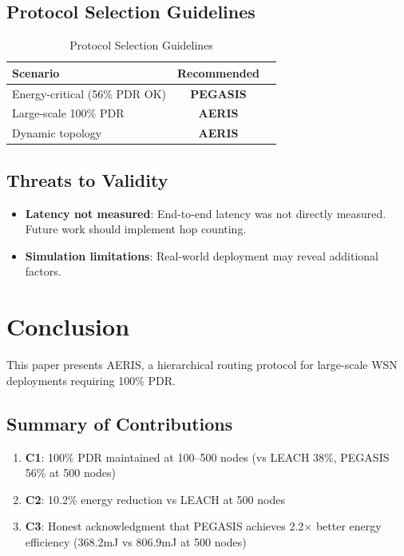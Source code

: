 \documentclass[twocolumn]{article}
\begin{document}
\subsection{Protocol Selection Guidelines}

\begin{table}[htbp]
\centering
\caption{Protocol Selection Guidelines}
\label{tab:guidelines}
\begin{tabular}{@{}lcc@{}}
\toprule
Scenario & Recommended \\
\midrule
Energy-critical (56\% PDR OK) & \textbf{PEGASIS} \\
Large-scale 100\% PDR & \textbf{AERIS} \\
Dynamic topology & \textbf{AERIS} \\
\bottomrule
\end{tabular}
\end{table}

\subsection{Threats to Validity}

\begin{itemize}
    \item \textbf{Latency not measured}: End-to-end latency was not directly
    measured. Future work should implement hop counting.
    \item \textbf{Simulation limitations}: Real-world deployment may reveal
    additional factors.
\end{itemize}

\section{Conclusion}
\label{sec:conclusion}

This paper presents AERIS, a hierarchical routing protocol for large-scale
WSN deployments requiring 100\% PDR.

\subsection{Summary of Contributions}

\begin{enumerate}
    \item \textbf{C1}: 100\% PDR maintained at 100--500 nodes (vs LEACH 38\%,
    PEGASIS 56\% at 500 nodes)
    \item \textbf{C2}: 10.2\% energy reduction vs LEACH at 500 nodes
    \item \textbf{C3}: Honest acknowledgment that PEGASIS achieves 2.2$\times$
    better energy efficiency (368.2mJ vs 806.9mJ at 500 nodes)
\end{enumerate}
\end{document}

